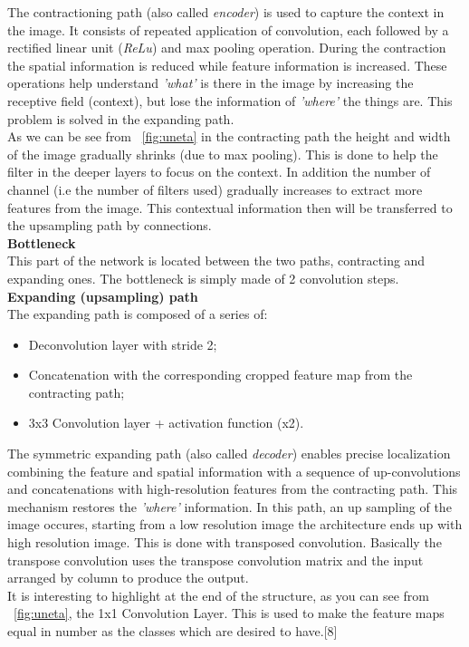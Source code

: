 \documentclass[12pt,a4paper,oneside]{report} %
\begin{document}
The contractioning path (also called \textit {encoder}) is used to capture the context in the image. 
It consists of repeated application of convolution, each followed by a rectified linear unit (\textit {ReLu}) and max pooling operation. During 
the contraction the spatial information is reduced while feature information is increased. These operations help understand \textit{'what'} is there in the image by increasing the 
receptive field (context), but lose the information of \textit{'where'} the things are. This problem is solved in the expanding path.\\
As we can be see from \figurename~\ref{fig:uneta} in the contracting path the height and width of the image gradually shrinks (due to max pooling). This is done to help the filter in 
the deeper layers to focus on the context. In addition the number of channel (i.e the number of filters used) gradually increases to extract more features from the image.
This contextual information then will be transferred to the upsampling path by connections.
\\
\newline
{\large{\bf Bottleneck}}\\
This part of the network is located between the two paths, contracting and expanding ones. The bottleneck is simply made of 2 convolution steps.
\\
\newline
{\large{\bf Expanding (upsampling) path}}\\
The expanding path is composed of a series of:
\begin{itemize}
\item Deconvolution layer with stride 2;
\item Concatenation with the corresponding cropped feature map from the contracting path;
\item 3x3 Convolution layer + activation function (x2).
\end{itemize}
The symmetric expanding path (also called \textit{decoder}) enables precise localization combining the feature and spatial information with a sequence of up-convolutions and 
concatenations with high-resolution features from the contracting path. This mechanism restores the \textit{'where'} information. In this path, an up sampling of the image occures, starting from a low resolution image the architecture ends up with high resolution image. This is done with transposed convolution. Basically the transpose convolution uses the transpose 
convolution matrix and the input arranged by column to produce the output. 
\\
It is interesting to highlight at the end of the structure, as you can see from \figurename~\ref{fig:uneta}, the 1x1 Convolution Layer. This is used to make the feature maps equal in number as the classes which are desired to have.[8]
\\
\end{document}
